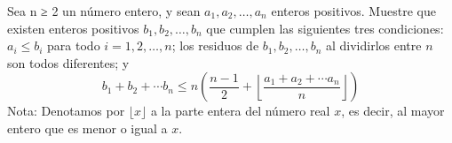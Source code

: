 Sea n ≥ 2 un número entero, y sean $a_1, a_2, \dots , a_n$ enteros positivos. Muestre que
existen enteros positivos $b_1, b_2, \dots , b_n$ que cumplen las siguientes tres condiciones: $a_i \le b_i$ para todo $i = 1, 2, \dots , n$; los residuos de $b_1, b_2, \dots , b_n$ al dividirlos entre $n$ son todos diferentes; y
\[b_1+b_2+\cdots b_n \le n\left(\frac{n-1}{2}+\left\lfloor \frac{a_1+a_2+\cdots a_n}{n}\right \rfloor \right)\]
Nota: Denotamos por $\lfloor x\rfloor$ a la parte entera del número real $x$, es decir, al mayor entero que es menor
o igual a $x$.